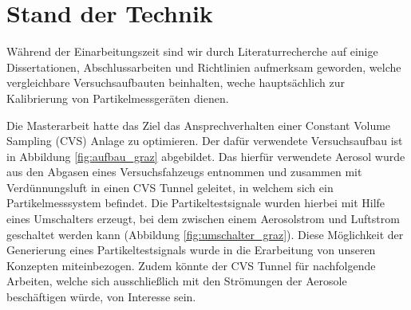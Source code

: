 \section{Stand der Technik}
W\"{a}hrend der Einarbeitungszeit sind wir durch Literaturrecherche auf einige Dissertationen, Abschlussarbeiten und Richtlinien aufmerksam geworden, welche vergleichbare Versuchsaufbauten beinhalten, weche haupts\"{a}chlich zur Kalibrierung von Partikelmessger\"{a}ten dienen.

Die Masterarbeit \cite{tu_graz} hatte das Ziel das Ansprechverhalten einer Constant Volume Sampling (CVS) Anlage zu optimieren. Der daf\"{u}r verwendete Versuchsaufbau ist in Abbildung \ref{fig:aufbau_graz} abgebildet. Das hierf\"{u}r verwendete Aerosol wurde aus den Abgasen eines Versuchsfahzeugs entnommen und zusammen mit Verd\"{u}nnungsluft in einen CVS Tunnel geleitet, in welchem sich ein Partikelmesssystem befindet. Die Partikeltestsignale wurden hierbei mit Hilfe eines Umschalters erzeugt, bei dem zwischen einem Aerosolstrom und Luftstrom geschaltet werden kann (Abbildung \ref{fig:umschalter_graz}). Diese M\"{o}glichkeit der Generierung eines Partikeltestsignals wurde in die Erarbeitung von unseren Konzepten miteinbezogen. Zudem k\"{o}nnte der CVS Tunnel f\"{u}r nachfolgende Arbeiten, welche sich ausschlie{\ss}lich mit den Str\"{o}mungen der Aerosole besch\"{a}ftigen w\"{u}rde, von Interesse sein.

